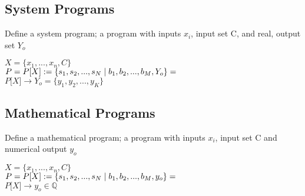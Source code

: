 \documentclass[11pt]{article}
\begin{document}
\subsection{System Programs}
Define a system program; a program with inputs $x_i$, input set C, and real, output set $Y_o$
\begin{center}
$
X = \{x_1,...,x_n,C\}
$
\\ \vspace{2mm}
$P = P\lbrack X \rbrack := \{ s_1,s_2,...,s_{N}\hspace{1mm}|\hspace{1mm} b_1, b_2,...,b_M,Y_o\}=$
\\ \vspace{2mm}
$
P\lbrack X \rbrack \rightarrow Y_o = \{y_1,y_2,...,y_K\}
$
\end{center}





\subsection{Mathematical Programs}
Define a mathematical program; a program with inputs $x_i$, input set C and numerical output $y_o$
\begin{center}
$
X = \{x_1,...,x_n,C\}
$
\\ \vspace{2mm}
$P = P\lbrack X \rbrack := \{ s_1,s_2,...,s_{N}\hspace{1mm}|\hspace{1mm} b_1, b_2,...,b_M,y_o\}=$
\\ \vspace{2mm}
$
P\lbrack X \rbrack \rightarrow y_o \in \mathbb{Q}
$
\end{center}











\end{document}
